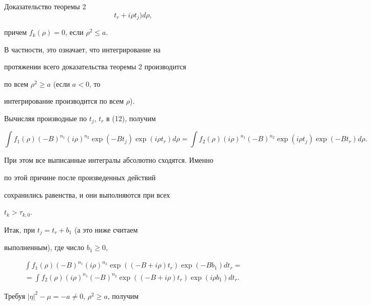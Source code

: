 \begin{pf*}{Доказательство теоремы 2}
\begin{equation}
t_{r}+i\rho t_{j}) d \rho, 


\end{equation}


причем $f_{k}(\rho)=0$, если $\rho ^{2} \le a$.


В частности, это означает, что интегрирование на


протяжении всего доказательства теоремы 2 производится


по всем $ \rho ^{2} \ge a$ (если $a<0$, то


интегрирование производится по всем $\rho$).





Вычисляя производные по $t_{j}$, $t_{r}$ в (12), получим


$$


\int f_{1}(\rho) (-B)^{n_{1}}


(i\rho)^{n_{2}} \exp (-Bt_{j})


\exp(i\rho t_{r}) d\rho = 


%


\int f_{2}(\rho) (i\rho)^{n_{1}} (-B)^{n_{2}}


\exp(i\rho t_{j}) \exp (-B t_{r}) d\rho . 


$$


При этом все выписанные интегралы абсолютно сходятся. Именно


по этой причине после произведенных действий


сохранились равенства, и они выполняются при всех


$t_{k}> \tau_{k, 0}$.





Итак, при $t_{j}=t_{r}+b_{1}$ (а это ниже считаем


выполненным), где число $b_{1} \ge 0$, 


\begin{multline*}


\int f_{1}(\rho) (-B)^{n_{1}}(i\rho)^{n_{2}} \exp ((-B+


 i\rho) t_{r}) \exp (-B b_{1})d t_{r}= \\


=\int f_{2}(\rho) (i\rho)^{n_{1}}(-B)^{n_{2}}


\exp ((-B+i\rho) t_{r}) \exp (i\rho b_{1})d t_{r}.


\end{multline*}


Требуя $|\eta|^2-\mu=-a\ne0$, $\rho^2\ge a$, получим



\end{pf*}
